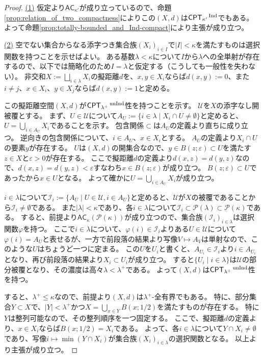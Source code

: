 \documentclass{jarticle}
\newcommand{\WithIndex}[1]{$\textrm{#1}{}^{\,\textrm{\scriptsize Ind}}$}
\newcommand{\WithoutIndex}[1]{$\textrm{#1}{}^{\,\textrm{\scriptsize unInd}}$}
\begin{document}
\begin{proof}
\underline{(1)}
仮定より$\mathsf{AC}_{\kappa'}$が成り立っているので、命題\ref{prop:relation_of_two_compactness}によりこの$(X,d)$は\WithIndex{$\mathsf{CPT}_{\kappa'}$}でもある。
よって命題\ref{prop:totally-bounded_and_Ind-compact}により主張が成り立つ。

\underline{(2)}
空でない集合からなる添字つき集合族$(X_i)_{i \in I}$で$|I| < \kappa$を満たすものは選択関数を持つことを示せばよい。
ある基数$\lambda < \kappa$について$I$から$\lambda$への全単射が存在するので、以下では簡略化のため$I = \lambda$と仮定する（こうしても一般性を失わない）。
非交和$X := \bigsqcup_{i \in \lambda} X_i$の擬距離$d$を、$x,y \in X_i$ならば$d(x,y) := 0$、また$i \neq j$、$x \in X_i$、$y \in X_j$ならば$d(x,y) := 1$と定める。

この擬距離空間$(X,d)$が\WithoutIndex{$\mathsf{CPT}_{\lambda^{+}}$}性を持つことを示す。
$\mathcal{U}$を$X$の添字なし開被覆とする。
まず、$U \in \mathcal{U}$について$A_U := \{i \in \lambda \mid X_i \cap U \neq \emptyset\}$と定めると、$U = \bigcup_{i \in A_U} X_i$であることを示す。
包含関係$\subset$は$A_U$の定義より直ちに成り立つ。
逆向きの包含関係について、$i \in A_U$、$x \in X_i$とする。
$A_U$の定義より$X_i \cap U$の要素$y$が存在する。
$U$は$(X,d)$の開集合なので、$y \in B(z;\varepsilon) \subset U$を満たす$z \in X$と$\varepsilon > 0$が存在する。
ここで擬距離$d$の定義より$d(x,z) = d(y,z)$なので、$d(x,z) = d(y,z) < \varepsilon$すなわち$x \in B(z;\varepsilon)$が成り立つ。
$B(z;\varepsilon) \subset U$であったから$x \in U$となる。
よって確かに$U = \bigcup_{i \in A_U} X_i$が成り立つ。

$i \in \lambda$について$\mathcal{I}_i := \{A_U \mid U \in \mathcal{U}, i \in A_U\}$と定めると、$\mathcal{U}$が$X$の被覆であることから$\mathcal{I}_i \neq \emptyset$である。
また$|\lambda| < \kappa$であり、各$i \in \lambda$について$\mathcal{I}_i \subset \mathcal{P}(\lambda) \subset \mathcal{P}(\kappa)$である。
すると、前提より$\mathsf{AC}_{\kappa}(\mathcal{P}(\kappa))$が成り立つので、集合族$(\mathcal{I}_i)_{i \in \lambda}$は選択関数$\varphi$を持つ。
ここで$i \in \lambda$について、$\varphi(i) \in \mathcal{I}_i$よりある$U \in \mathcal{U}$について$\varphi(i) = A_U$と表せるが、一方で前段落の結果より写像$V \mapsto A_V$は単射なので、このような$U$はちょうど一つに定まる。
この$U$を$U_i$と書くと、$A_{U_i} \in \mathcal{I}_i$より$i \in A_{U_i}$となり、再び前段落の結果より$X_i \subset U_i$が成り立つ。
すると$\{U_i \mid i \in \lambda\}$は$\mathcal{U}$の部分被覆となり、その濃度は高々$\lambda < \lambda^{+}$である。
よって$(X,d)$は\WithoutIndex{$\mathsf{CPT}_{\lambda^{+}}$}性を持つ。

すると、$\lambda^{+} \leq \kappa$なので、前提より$(X,d)$は$\lambda^{+}$-全有界でもある。
特に、部分集合$Y \subset X$で、$|Y| < \lambda^{+}$かつ$X = \bigcup_{x \in Y} B(x;1/2)$を満たすものが存在する。
特に$Y$は整列可能なので、その整列順序を一つ固定する。
ここで、擬距離$d$の定義より、$x \in X_i$ならば$B(x;1/2) = X_i$である。
よって、各$i \in \lambda$について$Y \cap X_i \neq \emptyset$であり、写像$i \mapsto \min (Y \cap X_i)$が集合族$(X_i)_{i \in \lambda}$の選択関数となる。
以上より主張が成り立つ。
\end{proof}
\end{document}
